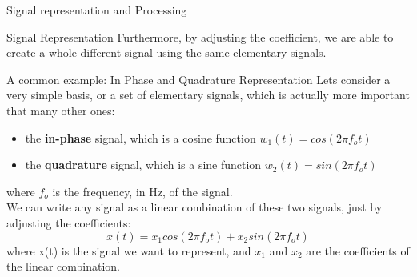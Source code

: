 \begin{section}{Signal representation and Processing}
\begin{subsection}{Signal Representation}
    Furthermore, by adjusting the coefficient, we are able to create a whole different signal using
    the same elementary signals.
    \begin{subsubsection}{A common example: In Phase and Quadrature Representation}
      Lets consider a very simple basis, or a set of elementary signals, which is actually more 
      important that many other ones:
      \begin{itemize}
        \item the \textbf{in-phase} signal, which is a cosine function $w_1(t) = cos(2\pi f_o t)$
        \item the \textbf{quadrature} signal, which is a sine function $w_2(t) = sin(2\pi f_o t)$
      \end{itemize}
      where $f_o$ is the frequency, in Hz, of the signal.\\
      We can write any signal as a linear combination of these two signals, just by adjusting the
      coefficients:
      \begin{equation}
        x(t) = x_1 cos(2\pi f_o t) + x_2 sin(2\pi f_o t)
      \end{equation}
      where x(t) is the signal we want to represent, and $x_1$ and $x_2$ are the coefficients of the
      linear combination.\\


\end{subsubsection}
\end{subsection}
\end{section}
